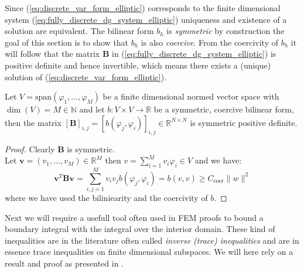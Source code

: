 Since (\ref{eq:discrete_var_form_elliptic}) corresponds to the finite dimensional
system (\ref{eq:fully_discrete_dg_system_elliptic}) uniqueness and existence of a solution
are equivalent.
The bilinear form $b_h$ is \textit{symmetric} by construction
the goal of this section is to show that $b_h$ is also \textit{coercive}.
From the coercivity of $b_h$ it will follow that the matrix $\textbf{B}$ in (\ref{eq:fully_discrete_dg_system_elliptic})
is positive definite and hence invertible, which means there exists a (unique) solution
of (\ref{eq:discrete_var_form_elliptic}).
\begin{lemma}
	Let $V = \text{span}(\varphi_1,\ldots,\varphi_M)$ be a finite dimensional
	normed vector space with $\dim(V) = M\in \mathbb{N}$ and let
	$b:V \times V \to \mathbb{R}$ be a symmetric, coercive bilinear form,
	then the matrix ${[\textbf{B}]}_{i,j} = {[b(\varphi_j, \varphi_i)]}_{i,j}\in \mathbb{R}^{N\times N}$
	is symmetric positive definite.
\end{lemma}
\begin{proof}
	Clearly $\textbf{B}$ is symmetric. \\
	Let $\textbf{v}=(v_1,\ldots,v_M)\in \mathbb{R}^M$ then $v = \sum_{i=1}^{M}
		v_i \varphi_i\in V$ and we have:
	\[
		\textbf{v}^{T}\textbf{B}\textbf{v} = \sum_{i,j=1}^{M}v_i v_j b(\varphi_j,\varphi_i) = b(v,v) \geq
		C_{\text{coer}} \|w\|^2
	\]
	where we have used the biliniearity and the coercivity of $b$.
\end{proof}
Next we will require a usefull tool often used in FEM proofs to bound
a boundary integral with the integral over the interior domain. These kind
of inequalities are in the literature often called \textit{inverse (trace) inequalities}
and are in essence trace inequalities on finite dimensional subspaces.
We will here rely on a result and proof as presented in \cite{warburtonHesthaven2003ineq}.

